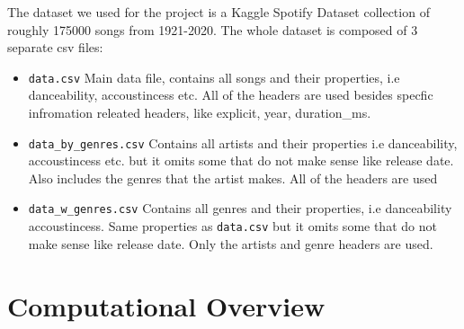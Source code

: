 \documentclass[fontsize=11pt]{article}
\begin{document}
    The dataset we used for the project is a Kaggle Spotify Dataset collection of roughly 175000 songs from 1921-2020. The whole dataset is composed of 3 separate csv files:
    \begin{itemize}
        \item \texttt{data.csv} Main data file, contains all songs and their properties, i.e danceability, accoustincess etc. All of the headers are used besides specfic infromation releated headers, like explicit, year, duration\_ms.
        \item \texttt{data\_by\_genres.csv} Contains all artists and their properties i.e danceability, accoustincess etc. but it omits some that do not make sense like release date. Also includes the genres that the artist makes. All of the headers are used
        \item \texttt{data\_w\_genres.csv} Contains all genres and their properties, i.e danceability accoustincess. Same properties as \texttt{data.csv} but it omits some that do not make sense like release date. Only the artists and genre headers are used.
    \end{itemize}

    \section*{Computational Overview}
\end{document}
